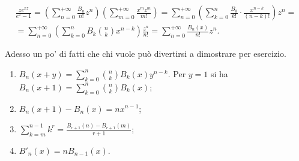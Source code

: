\begin{oss}
  \begin{gather*}
    \frac{ze^{xz}}{e^z-1}=\left(\sum_{n=0}^{+\infty}\frac{B_n}{n!}z^n\right)\left(\sum_{m=0}^{+\infty}\frac{x^mz^m}{m!}\right)=\sum_{n=0}^{+\infty}\left(\sum_{k=0}^n\frac{B_k}{k!}\cdot \frac{x^{n-k}}{(n-k)!}\right)z^n= \\
    =\sum_{n=0}^{+\infty}\left(\sum_{k=0}^nB_k\binom{n}{k}x^{n-k}\right)\frac{z^n}{n!}=\sum_{n=0}^{+\infty}\frac{B_n(x)}{n!}z^n.
  \end{gather*}
\end{oss}

Adesso un po' di fatti che chi vuole può divertirsi a dimostrare per esercizio.

\begin{ftt}
  \begin{enumerate}
    \item $\displaystyle B_n(x+y)=\sum_{k=0}^n\binom{n}{k}B_k(x)y^{n-k}$. Per $y=1$ si ha $\displaystyle B_n(x+1)=\sum_{k=0}^n\binom{n}{k}B_k(x)$;
    \item $B_n(x+1)-B_n(x)=nx^{n-1}$;
    \item $\displaystyle \sum_{k=m}^{n-1} k^r=\frac{B_{r+1}(n)-B_{r+1}(m)}{r+1}$;
    \item $B'_n(x)=nB_{n-1}(x)$.
  \end{enumerate}
\end{ftt}
